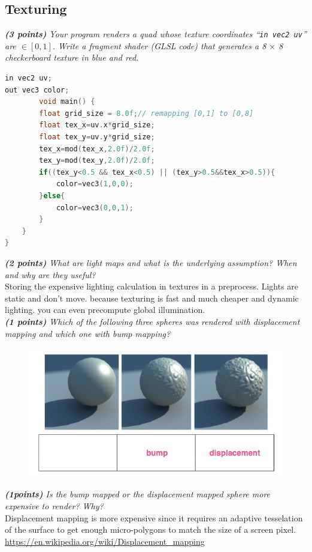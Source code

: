 \documentclass[a4paper,10pt]{article}
\begin{document}
\subsection{Texturing}
\textit{\textbf{(3 points)} Your program renders a quad whose texture coordinates ``\lstinline|in vec2 uv|'' are $\in [0, 1]$. Write a fragment shader (GLSL code) that generates a 8 $\times$ 8 checkerboard texture in blue and red.}\\
\begin{lstlisting}[language=C]
in vec2 uv;
out vec3 color;
		void main() {
		float grid_size = 8.0f;// remapping [0,1] to [0,8]
		float tex_x=uv.x*grid_size;
		float tex_y=uv.y*grid_size;
		tex_x=mod(tex_x,2.0f)/2.0f;
		tex_y=mod(tex_y,2.0f)/2.0f;
		if((tex_y<0.5 && tex_x<0.5) || (tex_y>0.5&&tex_x>0.5)){
			color=vec3(1,0,0);
		}else{
			color=vec3(0,0,1);
		}
	}
}
\end{lstlisting}

\textit{\textbf{(2 points)} What are light maps and what is the underlying assumption? When and why are they useful?}\\

Storing the expensive lighting calculation in textures in a preprocess. Lights are static and don’t move. because texturing is fast and much cheaper and dynamic lighting. you can even precompute global illumination.\\

\textit{\textbf{(1 points)} Which of the following three spheres was rendered with displacement
mapping and which one with bump mapping?}
\begin{figure}[H]
	\centering
	\includegraphics[width=.5\textwidth]{3-2-bump}
\end{figure}
\textit{\textbf{(1points) }Is the bump mapped or the displacement mapped sphere more expensive to render? Why?}\\

Displacement mapping is more expensive since it requires an adaptive tesselation
of the surface to get enough micro-polygons to match the size of a screen pixel.\\

\url{https://en.wikipedia.org/wiki/Displacement_mapping}\\
\end{document}
